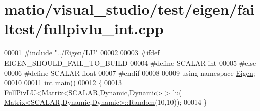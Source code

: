 \hypertarget{matio_2visual__studio_2test_2eigen_2failtest_2fullpivlu__int_8cpp_source}{}\section{matio/visual\+\_\+studio/test/eigen/failtest/fullpivlu\+\_\+int.cpp}
\label{matio_2visual__studio_2test_2eigen_2failtest_2fullpivlu__int_8cpp_source}

\begin{DoxyCode}
00001 \textcolor{preprocessor}{#include "../Eigen/LU"}
00002 
00003 \textcolor{preprocessor}{#ifdef EIGEN\_SHOULD\_FAIL\_TO\_BUILD}
00004 \textcolor{preprocessor}{#define SCALAR int}
00005 \textcolor{preprocessor}{#else}
00006 \textcolor{preprocessor}{#define SCALAR float}
00007 \textcolor{preprocessor}{#endif}
00008 
00009 \textcolor{keyword}{using namespace }\hyperlink{namespace_eigen}{Eigen};
00010 
00011 \textcolor{keywordtype}{int} main()
00012 \{
00013   \hyperlink{group___l_u___module_class_eigen_1_1_full_piv_l_u}{FullPivLU<Matrix<SCALAR,Dynamic,Dynamic>} > lu(
      \hyperlink{group___core___module_class_eigen_1_1_matrix}{Matrix<SCALAR,Dynamic,Dynamic>::Random}(10,10));
00014 \}
\end{DoxyCode}
